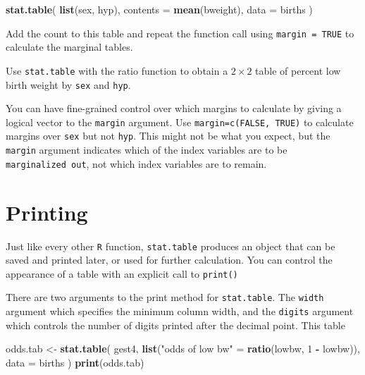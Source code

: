 \documentclass[
]{book}
\newenvironment{Shaded}{\begin{snugshade}}{\end{snugshade}}
\newcommand{\AttributeTok}[1]{\textcolor[rgb]{0.13,0.29,0.53}{#1}}
\newcommand{\DecValTok}[1]{\textcolor[rgb]{0.00,0.00,0.81}{#1}}
\newcommand{\FunctionTok}[1]{\textcolor[rgb]{0.13,0.29,0.53}{\textbf{#1}}}
\newcommand{\NormalTok}[1]{#1}
\newcommand{\OtherTok}[1]{\textcolor[rgb]{0.56,0.35,0.01}{#1}}
\newcommand{\SpecialCharTok}[1]{\textcolor[rgb]{0.81,0.36,0.00}{\textbf{#1}}}
\newcommand{\StringTok}[1]{\textcolor[rgb]{0.31,0.60,0.02}{#1}}
\begin{document}
\begin{Shaded}
\begin{Highlighting}[]
\FunctionTok{stat.table}\NormalTok{(}
  \FunctionTok{list}\NormalTok{(sex, hyp), }
  \AttributeTok{contents =} \FunctionTok{mean}\NormalTok{(bweight), }
  \AttributeTok{data =}\NormalTok{ births}
\NormalTok{)}
\end{Highlighting}
\end{Shaded}

Add the count to this table and repeat the function call using \texttt{margin\ =\ TRUE} to calculate the
marginal tables.

Use \texttt{stat.table} with the ratio function to obtain a \(2\times 2\) table of percent low birth weight by \texttt{sex} and \texttt{hyp}.

You can have fine-grained control over which margins to calculate by
giving a logical vector to the \texttt{margin} argument. Use \texttt{margin=c(FALSE,\ TRUE)}
to calculate margins over \texttt{sex} but not
\texttt{hyp}. This might not be what you expect, but the \texttt{margin}
argument indicates which of the index variables are to be \texttt{marginalized\ out},
not which index variables are to remain.

\section{Printing}\label{printing}

Just like every other \texttt{R} function, \texttt{stat.table} produces
an object that can be saved and printed later, or used for further
calculation. You can control the appearance of a table with an explicit
call to \texttt{print()}

There are two arguments to the print method for \texttt{stat.table}. The
\texttt{width} argument which specifies the minimum column width, and the
\texttt{digits} argument which controls
the number of digits printed after the decimal point. This table

\begin{Shaded}
\begin{Highlighting}[]
\NormalTok{odds.tab }\OtherTok{\textless{}{-}} 
  \FunctionTok{stat.table}\NormalTok{(}
\NormalTok{    gest4, }
    \FunctionTok{list}\NormalTok{(}\StringTok{"odds of low bw"} \OtherTok{=} \FunctionTok{ratio}\NormalTok{(lowbw, }\DecValTok{1} \SpecialCharTok{{-}}\NormalTok{ lowbw)),}
    \AttributeTok{data =}\NormalTok{ births}
\NormalTok{)}
\FunctionTok{print}\NormalTok{(odds.tab)}
\end{Highlighting}
\end{Shaded}
\end{document}
